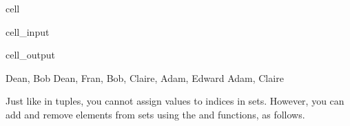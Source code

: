 \documentclass[letterpaper,10pt,english]{jupyterBook}
\begin{document}
\begin{sphinxuseclass}{cell}\begin{sphinxVerbatimInput}

\begin{sphinxuseclass}{cell_input}
\begin{sphinxVerbatim}[commandchars=\\\{\}]
     
     
 
 
 
\end{sphinxVerbatim}

\end{sphinxuseclass}\end{sphinxVerbatimInput}
\begin{sphinxVerbatimOutput}

\begin{sphinxuseclass}{cell_output}
\begin{sphinxVerbatim}[commandchars=\\\{\}]
\PYGZob{}\PYGZsq{}Dean\PYGZsq{}, \PYGZsq{}Bob\PYGZsq{}\PYGZcb{}
\PYGZob{}\PYGZsq{}Dean\PYGZsq{}, \PYGZsq{}Fran\PYGZsq{}, \PYGZsq{}Bob\PYGZsq{}, \PYGZsq{}Claire\PYGZsq{}, \PYGZsq{}Adam\PYGZsq{}, \PYGZsq{}Edward\PYGZsq{}\PYGZcb{}
\PYGZob{}\PYGZsq{}Adam\PYGZsq{}, \PYGZsq{}Claire\PYGZsq{}\PYGZcb{}
\end{sphinxVerbatim}

\end{sphinxuseclass}\end{sphinxVerbatimOutput}

\end{sphinxuseclass}
\sphinxAtStartPar
Just like in tuples, you cannot assign values to indices in sets. However, you can add and remove elements from sets using the  and  functions, as follows.
\end{document}
